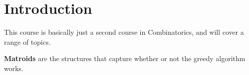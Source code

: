 
\section{Introduction}

This course is basically just a second course in Combinatorics, and will cover a range of topics.

\begin{definition}
	\textbf{Matroids} are the structures that capture whether or not the greedy algorithm works.
\end{definition}
